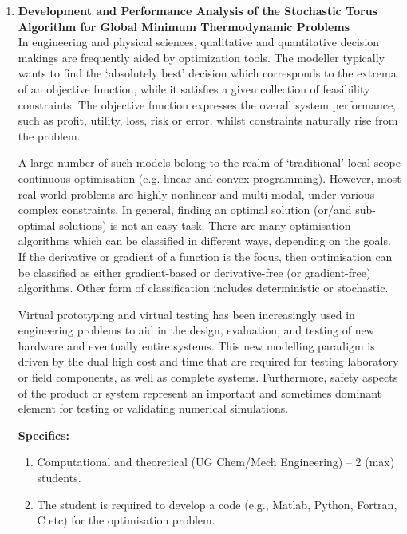 \documentclass[12pts,a4paper,amsmath,amssymb,floatfix]{article}%
\newcommand{\Chem}{UG Chem/Mech Engineering}
\begin{document}
\begin{enumerate}[label=\bfseries Project: \arabic*:]
\clearpage

\item {\bf Development and Performance Analysis of the Stochastic Torus Algorithm for Global Minimum Thermodynamic Problems} \\

In engineering and physical sciences, qualitative and quantitative decision makings are frequently aided by optimization tools. The modeller typically wants to find the `absolutely best’ decision which corresponds to the extrema of an objective function, while it satisfies a given collection of feasibility constraints. The objective function expresses the overall system performance, such as profit, utility, loss, risk or error, whilst constraints naturally rise from the problem.

A large number of such models belong to the realm of `traditional' local scope continuous optimisation (e.g. linear and convex programming). However, most real-world problems are highly nonlinear and multi-modal, under various complex constraints. In general, finding an optimal solution (or/and sub-optimal solutions) is not an easy task. There are many optimisation algorithms which can be classified in different ways, depending on the goals. If the derivative or gradient of a function is the focus, then optimisation can be classified as either gradient-based or derivative-free (or gradient-free) algorithms. Other form of classification includes deterministic or stochastic.

Virtual prototyping and virtual testing has been increasingly used in engineering problems to aid in the design, evaluation, and testing of new hardware and eventually entire systems. This new modelling paradigm is driven by the dual high cost and time that are required for testing laboratory or field components, as well as complete systems. Furthermore, safety aspects of the product or system represent an important and sometimes dominant element for testing or validating numerical simulations.

\noindent
{\bf Specifics:} 
\begin{enumerate}
\item Computational and theoretical (\Chem) -- 2 (max) students. 
\item The student is required to develop a code (e.g., Matlab, Python, Fortran, C etc) for the optimisation problem.
\end{enumerate} 


\end{enumerate}
\end{document}
